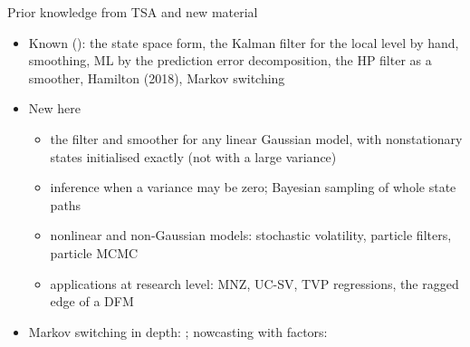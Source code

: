 \begin{frame}{Prior knowledge from TSA and new material}
\itemsize{\small}
\begin{itemize}
    \item Known (): the state space form, the Kalman filter for the local level by hand, smoothing, ML by the prediction error decomposition, the HP filter as a smoother, Hamilton (2018), Markov switching
    \item New here
    \begin{itemize}
        \item the filter and smoother for any linear Gaussian model, with nonstationary states initialised exactly (not with a large variance)
        \item inference when a variance may be zero; Bayesian sampling of whole state paths
        \item nonlinear and non-Gaussian models: stochastic volatility, particle filters, particle MCMC
        \item applications at research level: MNZ, UC-SV, TVP regressions, the ragged edge of a DFM
    \end{itemize}
    \item Markov switching in depth: ; nowcasting with factors: 
\end{itemize}
\end{frame}

